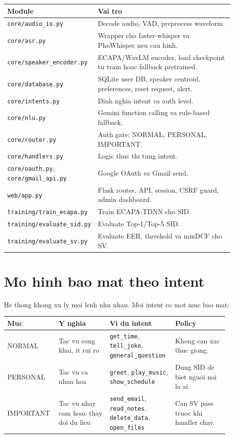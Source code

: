 \documentclass[12pt,a4paper]{article}
\begin{document}
\begin{longtable}{p{0.25\linewidth}p{0.67\linewidth}}
\toprule
\textbf{Module} & \textbf{Vai tro} \\
\midrule
\endhead
\texttt{core/audio\_io.py} & Decode audio, VAD, preprocess waveform. \\
\texttt{core/asr.py} & Wrapper cho faster-whisper va PhoWhisper neu cau hinh. \\
\texttt{core/speaker\_encoder.py} & ECAPA/WavLM encoder, load checkpoint tu train hoac fallback pretrained. \\
\texttt{core/database.py} & SQLite user DB, speaker centroid, preferences, reset request, alert. \\
\texttt{core/intents.py} & Dinh nghia intent va auth level. \\
\texttt{core/nlu.py} & Gemini function calling va rule-based fallback. \\
\texttt{core/router.py} & Auth gate: NORMAL, PERSONAL, IMPORTANT. \\
\texttt{core/handlers.py} & Logic thuc thi tung intent. \\
\texttt{core/oauth.py}, \texttt{core/gmail\_api.py} & Google OAuth va Gmail send. \\
\texttt{web/app.py} & Flask routes, API, session, CSRF guard, admin dashboard. \\
\texttt{training/train\_ecapa.py} & Train ECAPA-TDNN cho SID. \\
\texttt{training/evaluate\_sid.py} & Evaluate Top-1/Top-5 SID. \\
\texttt{training/evaluate\_sv.py} & Evaluate EER, threshold va minDCF cho SV. \\
\bottomrule
\end{longtable}

\section{Mo hinh bao mat theo intent}

He thong khong xu ly moi lenh nhu nhau. Moi intent co mot muc bao mat:

\begin{longtable}{p{0.18\linewidth}p{0.22\linewidth}p{0.27\linewidth}p{0.23\linewidth}}
\toprule
\textbf{Muc} & \textbf{Y nghia} & \textbf{Vi du intent} & \textbf{Policy} \\
\midrule
\endhead
NORMAL & Tac vu cong khai, it rui ro & \texttt{get\_time}, \texttt{tell\_joke}, \texttt{general\_question} & Khong can xac thuc giong. \\
PERSONAL & Tac vu ca nhan hoa & \texttt{greet}, \texttt{play\_music}, \texttt{show\_schedule} & Dung SID de biet nguoi noi la ai. \\
IMPORTANT & Tac vu nhay cam hoac thay doi du lieu & \texttt{send\_email}, \texttt{read\_notes}, \texttt{delete\_data}, \texttt{open\_files} & Can SV pass truoc khi handler chay. \\
\bottomrule
\end{longtable}
\end{document}
